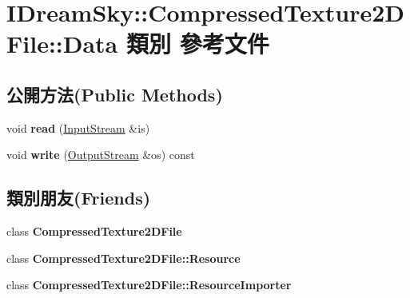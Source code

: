 \hypertarget{class_i_dream_sky_1_1_compressed_texture2_d_file_1_1_data}{}\section{I\+Dream\+Sky\+:\+:Compressed\+Texture2\+D\+File\+:\+:Data 類別 參考文件}
\label{class_i_dream_sky_1_1_compressed_texture2_d_file_1_1_data}
\subsection*{公開方法(Public Methods)}
\begin{DoxyCompactItemize}
\item 
void {\bfseries read} (\hyperlink{class_i_dream_sky_1_1_input_stream}{Input\+Stream} \&is)\hypertarget{class_i_dream_sky_1_1_compressed_texture2_d_file_1_1_data_add519cfe7521ac1c4f4c35e6650ddf45}{}\label{class_i_dream_sky_1_1_compressed_texture2_d_file_1_1_data_add519cfe7521ac1c4f4c35e6650ddf45}

\item 
void {\bfseries write} (\hyperlink{class_i_dream_sky_1_1_output_stream}{Output\+Stream} \&os) const \hypertarget{class_i_dream_sky_1_1_compressed_texture2_d_file_1_1_data_a18b9607792fd17527f419308eab5c297}{}\label{class_i_dream_sky_1_1_compressed_texture2_d_file_1_1_data_a18b9607792fd17527f419308eab5c297}

\end{DoxyCompactItemize}
\subsection*{類別朋友(Friends)}
\begin{DoxyCompactItemize}
\item 
class {\bfseries Compressed\+Texture2\+D\+File}\hypertarget{class_i_dream_sky_1_1_compressed_texture2_d_file_1_1_data_a65b38357d7981d5bca6b1249ed028b3d}{}\label{class_i_dream_sky_1_1_compressed_texture2_d_file_1_1_data_a65b38357d7981d5bca6b1249ed028b3d}

\item 
class {\bfseries Compressed\+Texture2\+D\+File\+::\+Resource}\hypertarget{class_i_dream_sky_1_1_compressed_texture2_d_file_1_1_data_a9dd0c389cf2c997f63452a4fe72c57aa}{}\label{class_i_dream_sky_1_1_compressed_texture2_d_file_1_1_data_a9dd0c389cf2c997f63452a4fe72c57aa}

\item 
class {\bfseries Compressed\+Texture2\+D\+File\+::\+Resource\+Importer}\hypertarget{class_i_dream_sky_1_1_compressed_texture2_d_file_1_1_data_a351231df6cf0da6c427cc49df05e1154}{}\label{class_i_dream_sky_1_1_compressed_texture2_d_file_1_1_data_a351231df6cf0da6c427cc49df05e1154}

\end{DoxyCompactItemize}


